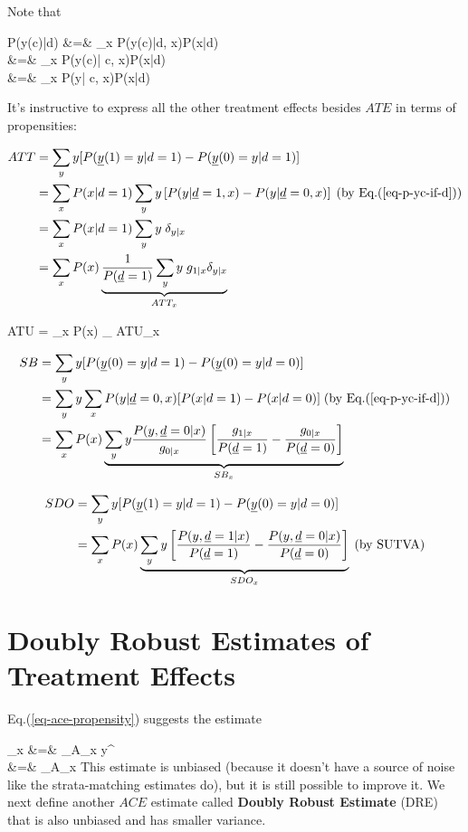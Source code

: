 Note that

\beqa
P(y(c)|d)
&=&
\sum_x P(y(c)|d, x)P(x|d)
\\
&=&
\sum_x P(y(c)| c, x)P(x|d) \;
\\
&=&
\sum_x P(y| c, x)P(x|d)\;
\label{eq-p-yc-if-d}
\eeqa

It's
instructive
to express all the
other treatment effects besides
$ATE$ in terms of propensities:

\begin{align}
ATT
&=
 \sum_y y [P(\rvy(1)=y|d=1)
-P(\rvy(0)=y|d=1)]
\\
&=
\sum_x P(x|d=1)
\sum_y y
\left[
P(y|\rvd=1,x)
-
P(y|\rvd=0,x)
\right]
\;\text{(by Eq.(\ref{eq-p-yc-if-d}))}
\\
&=
\sum_x P(x|d=1)
\sum_y y \;\delta_{y|x}
\\
&=
\sum_x P(x)
\underbrace{
\frac{1}{P(\rvd=1)}
\sum_y y\; g_{1|x}\delta_{y|x}
}_
{ATT_x}
\end{align}

\beq
ATU
=
\sum_x P(x)
_
{ATU_x}
\eeq

\begin{align}
SB&= \sum_y y
[P(\rvy(0)=y|d=1)-P(\rvy(0)=y|d=0)]
\\
&=
\sum_y y
\sum_x P(y| \rvd=0,x)
[
P(x|d=1)-P(x|d=0)]
\;\text{(by Eq.(\ref{eq-p-yc-if-d}))}
\\
&=
\sum_x P(x)
\underbrace{\sum_y y
\frac{P(y, \rvd=0|x)}{g_{0|x}}
\left[
\frac{g_{1|x}}{P(\rvd=1)}
-
\frac{g_{0|x}}{P(\rvd=0)}
\right]}_{SB_x}
\end{align}

\begin{align}
SDO
&=
\sum_y y
[P(\rvy(1)=y|d=1)-P(\rvy(0)=y|d=0)]
\\
&=
\sum_x P(x)
\underbrace{\sum_y y
\left[
\frac{P(y, \rvd=1|x)}{P(\rvd=1)}
-
\frac{P(y, \rvd=0|x)}{P(\rvd=0)}
\right]}_{SDO_x}
\;\text{(by SUTVA)}
\end{align}



\section{Doubly Robust Estimates of Treatment Effects}



Eq.(\ref{eq-ace-propensity})
 suggests the estimate

\beqa
{}_x
&=&
\sum_{\s\in A_x}
y^\s
{}
\\
&=&
\sum_{\s \in A_x}
\label{eq-ace-esti-posi}
\eeqa
This
estimate is unbiased
(because it doesn't
have a source
of noise like the
strata-matching
estimates do),
but it is still possible to
improve it.
We next
define
another $ACE$ estimate
called
{\bf Doubly Robust Estimate} (DRE)
that is also
unbiased and has smaller
variance.

